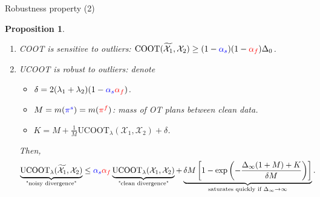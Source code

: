 \documentclass{beamer}
\newcommand{\coot}{\text{COOT}}
\newcommand{\ucoot}{\text{UCOOT}}
\newcommand{\cX}{\mathcal X}
\newcommand{\pis}{{\color{blue}{\pi^s}}}
\newcommand{\pif}{{\color{red}{\pi^f}}}
\newtheorem{proposition}{Proposition}[section]
\begin{document}
\begin{frame}{Robustness property (2)}
\scriptsize
\vspace{-0.2cm}
\begin{proposition}
  \begin{enumerate}
    \setlength\itemindent{5pt}
    \item[1.] COOT is sensitive to outliers:
    $\coot(\widetilde{\cX_1}, \cX_2) \geq (1 - {\color{blue}{\alpha_s}})(1 - {\color{red}{\alpha_f}})\Delta_0$.

    \item[2.] UCOOT is robust to outliers: denote
    \begin{itemize}
      \scriptsize
      \setlength\itemindent{10pt}
      \item[$\bullet$] $\delta = 2(\lambda_1 + \lambda_2)(1 - {\color{blue}{\alpha_s}} {\color{red}{\alpha_f}})$.

      \item[$\bullet$] $M= m(\pis) = m(\pif)$: mass of OT plans between clean data.

      \item[$\bullet$] $K = M + \frac{1}{M}\ucoot_{\lambda}(\cX_1, \cX_2) + \delta$.
    \end{itemize}
    Then,
    \vspace{-0.4cm}
    \begin{equation*} %
    \begin{split}
      \underbrace{\ucoot_{\lambda}(\widetilde{\cX_1}, \cX_2)}_{\text{"noisy divergence"}}
      &\leq {\color{blue}{\alpha_s}} {\color{red}{\alpha_f}}
      \underbrace{\ucoot_{\lambda}(\cX_1, \cX_2)}_{\text{"clean divergence"}}
      + \underbrace{\delta M \left[ 1 -
      \exp \left( {- \frac{\Delta_{\infty}(1+M) + K}{\delta M}} \right) \right]}_{\text{saturates quickly if } \Delta_{\infty} \to \infty}.
    \end{split}
    \end{equation*}
  \end{enumerate}


\end{proposition}
\end{frame}
\end{document}
